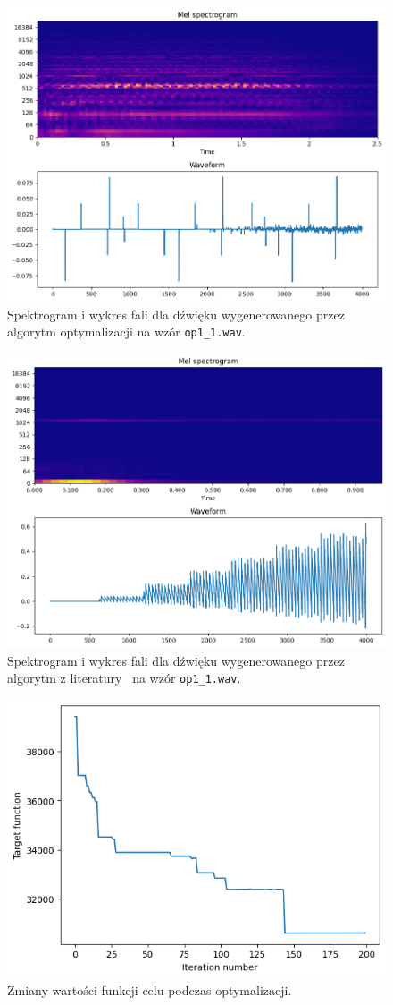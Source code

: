 \begin{figure}[H]
    \centering
    \includegraphics[width=0.7\linewidth]{rys06/evolved_sample_op1.png}
    \caption{
      Spektrogram i wykres fali dla dźwięku wygenerowanego
      przez algorytm optymalizacji na wzór \texttt{op1\_1.wav}.
    }\label{fig:evolved_op1_sound_overview}
\end{figure}


\begin{figure}[H]
    \centering
    \includegraphics[width=0.7\linewidth]{rys06/macret_evolved_op1.png}
    \caption{
      Spektrogram i wykres fali dla dźwięku wygenerowanego
      przez algorytm z literatury~\cite{evolutionary_puredata} na wzór \texttt{op1\_1.wav}.
    }\label{fig:evolved_literature_op1_sound_overview}
\end{figure}

\begin{figure}[H]
    \centering
    \includegraphics[width=0.6\linewidth]{rys06/op1_target_fun_values.png}
    \caption{
      Zmiany wartości funkcji celu podczas optymalizacji.
    }\label{fig:op1_target_fun_values}
\end{figure}

